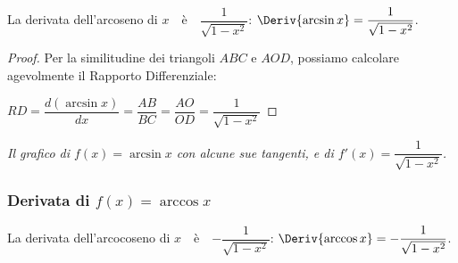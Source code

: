 \begin{teorema}
La derivata dell'arcoseno di \(x\)~~è~~\(\dfrac{1}{\sqrt{1-x^2}}\): \quad 
\(\Deriv{\arcsin x} = \dfrac{1}{\sqrt{1-x^2}}\).
\end{teorema}
\begin{proof}
Per la similitudine dei triangoli \(ABC\) e \(AOD\), possiamo 
calcolare agevolmente il Rapporto Differenziale:

\hspace{30mm}
\(RD = \dfrac{d (\arcsin x)}{dx} = \dfrac{AB}{BC} = 
       \dfrac{AO}{OD} = 
       \dfrac{1}{\sqrt{1-x^2}}\)
\end{proof}

\begin{inaccessibleblock}
\hspace{-20mm}
\end{inaccessibleblock}
\label{img:diff_parabola_con_pendenze}
\begin{center} 
\emph{Il grafico di \(f(x)=\arcsin x\) con alcune sue tangenti, e di 
\(f'(x)=\dfrac{1}{\sqrt{1-x^2}}\).}
\end{center}

\subsubsection{Derivata di \(f(x)=\arccos x\)}

\begin{teorema}
La derivata dell'arcocoseno di \(x\)~~è~~\(-\dfrac{1}{\sqrt{1-x^2}}\): \quad 
\(\Deriv{\arccos x} = -\dfrac{1}{\sqrt{1-x^2}}\).
\end{teorema}

